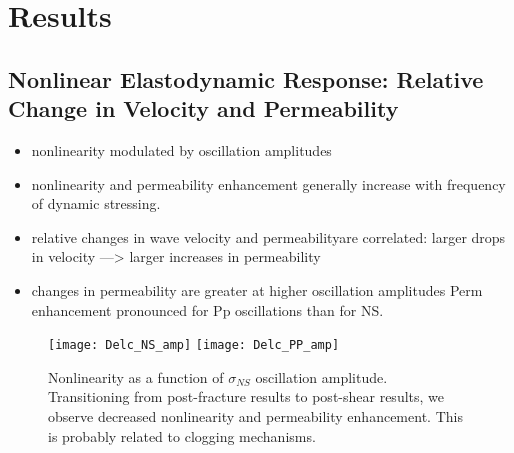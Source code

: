 \documentclass[letterpaper,10pt]{article}
\begin{document}
%
%

\section{Results}
\subsection{Nonlinear Elastodynamic Response: Relative Change in Velocity and Permeability}
\begin{itemize}
	\item nonlinearity modulated by oscillation amplitudes
\item nonlinearity and permeability enhancement generally increase with frequency of dynamic stressing.
\item relative changes in wave velocity and permeabilityare correlated: larger drops in velocity —> larger increases in permeability
\item changes in permeability are greater at higher oscillation amplitudes 
\subitem Perm enhancement pronounced for Pp oscillations than for NS.
\end{itemize}


\begin{figure}[ht]
	\centering
	\texttt{[image: Delc\_NS\_amp]}
	\texttt{[image: Delc\_PP\_amp]}
	\caption{Nonlinearity as a function of $ \sigma_{NS} $ oscillation amplitude. Transitioning from post-fracture results to post-shear results, we observe decreased nonlinearity and permeability enhancement. This is probably related to clogging mechanisms.}%
	\label{fig:delc_ns_amp}
\end{figure}
\end{document}
